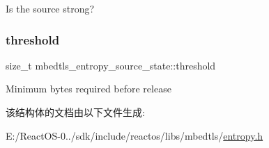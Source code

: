 Is the source strong? \mbox{\label{structmbedtls__entropy__source__state_ab5ac92f3c7acd5a47ee986fb915e9686}} 
\subsubsection{\texorpdfstring{threshold}{threshold}}
{\footnotesize\ttfamily size\+\_\+t mbedtls\+\_\+entropy\+\_\+source\+\_\+state\+::threshold}

Minimum bytes required before release 

该结构体的文档由以下文件生成\+:\begin{DoxyCompactItemize}
\item 
E\+:/\+React\+O\+S-\/0../sdk/include/reactos/libs/mbedtls/\hyperlink{entropy_8h}{entropy.\+h}\end{DoxyCompactItemize}
